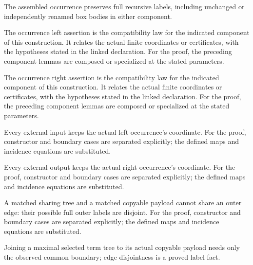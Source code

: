 The assembled occurrence preserves full recursive labels, including unchanged or independently renamed box bodies in either component.
\par{}

The occurrence left assertion is the compatibility law for the indicated component of this construction. It relates the actual finite coordinates or certificates, with the hypotheses stated in the linked declaration.
For the proof, the preceding component lemmas are composed or specialized at the stated parameters.
\par{}

The occurrence right assertion is the compatibility law for the indicated component of this construction. It relates the actual finite coordinates or certificates, with the hypotheses stated in the linked declaration.
For the proof, the preceding component lemmas are composed or specialized at the stated parameters.
\par{}

Every external input keeps the actual left occurrence's coordinate.
For the proof, constructor and boundary cases are separated explicitly; the defined maps and incidence equations are substituted.
\par{}

Every external output keeps the actual right occurrence's coordinate.
For the proof, constructor and boundary cases are separated explicitly; the defined maps and incidence equations are substituted.
\par{}

A matched sharing tree and a matched copyable payload cannot share an outer edge: their possible full outer labels are disjoint.
For the proof, constructor and boundary cases are separated explicitly; the defined maps and incidence equations are substituted.
\par{}

Joining a maximal selected term tree to its actual copyable payload needs only the observed common boundary; edge disjointness is a proved label fact.
\par{}

